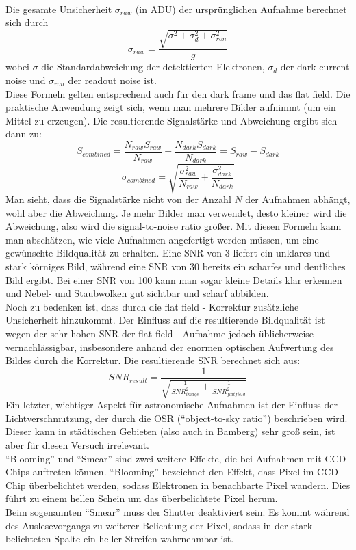 \\
Die gesamte Unsicherheit $\sigma_{raw}$ (in ADU) der ursprünglichen Aufnahme berechnet sich durch 
\begin{equation}
\sigma_{raw} = \frac{\sqrt{\sigma^2 + \sigma_d^2 + \sigma_{ron}^2}}{g}
\end{equation}
wobei $\sigma$ die Standardabweichung der detektierten Elektronen, $\sigma_d$ der dark current noise und $\sigma_{ron}$ der readout noise ist.
\\
Diese Formeln gelten entsprechend auch für den dark frame und das flat field.
Die praktische Anwendung zeigt sich, wenn man mehrere Bilder aufnimmt (um ein Mittel zu erzeugen). Die resultierende Signalstärke und Abweichung ergibt sich dann zu:
\begin{equation}
S_{combined} = \frac{N_{raw}S_{raw}}{N_{raw}} - \frac{N_{dark}S_{dark}}{N_{dark}} = S_{raw} - S_{dark}
\end{equation}
\begin{equation}
\sigma_{combined} = \sqrt{\frac{\sigma_{raw}^2}{N_{raw}} + \frac{\sigma_{dark}^2}{N_{dark}}}
\end{equation}
Man sieht, dass die Signalstärke nicht von der Anzahl $N$ der Aufnahmen abhängt, wohl aber die Abweichung. Je mehr Bilder man verwendet, desto kleiner wird die Abweichung, also wird die signal-to-noise ratio größer. Mit diesen Formeln kann man abschätzen, wie viele Aufnahmen angefertigt werden müssen, um eine gewünschte Bildqualität zu erhalten. Eine SNR von 3 liefert ein unklares und stark körniges Bild, während eine SNR von 30 bereits ein scharfes und deutliches Bild ergibt. Bei einer SNR von 100 kann man sogar kleine Details klar erkennen und Nebel- und Staubwolken gut sichtbar und scharf abbilden.
\\
Noch zu bedenken ist, dass durch die flat field - Korrektur zusätzliche Unsicherheit hinzukommt. Der Einfluss auf die resultierende Bildqualität ist wegen der sehr hohen SNR der flat field - Aufnahme jedoch üblicherweise vernachlässigbar, insbesondere anhand der enormen optischen Aufwertung des Bildes durch die Korrektur. Die resultierende SNR berechnet sich aus:
\begin{equation}
SNR_{result} = \frac{1}{\sqrt{\frac{1}{SNR_{image}^2} + \frac{1}{SNR_{flatfield}^2}}}
\end{equation}
Ein letzter, wichtiger Aspekt für astronomische Aufnahmen ist der Einfluss der Lichtverschmutzung, der durch die OSR (\enquote{object-to-sky ratio}) beschrieben wird. Dieser kann in städtischen Gebieten (also auch in Bamberg) sehr groß sein, ist aber für diesen Versuch irrelevant.\\
\enquote{Blooming} und \enquote{Smear} sind zwei weitere Effekte, die bei Aufnahmen mit CCD-Chips auftreten können. 
\enquote{Blooming} bezeichnet den Effekt, dass Pixel im CCD-Chip überbelichtet werden, sodass Elektronen in benachbarte Pixel wandern. Dies führt zu einem hellen Schein um das überbelichtete Pixel herum. \\
Beim sogenannten \enquote{Smear} muss der Shutter deaktiviert sein. Es kommt während des Auslesevorgangs zu weiterer Belichtung der Pixel, sodass in der stark belichteten Spalte ein heller Streifen wahrnehmbar ist. 


